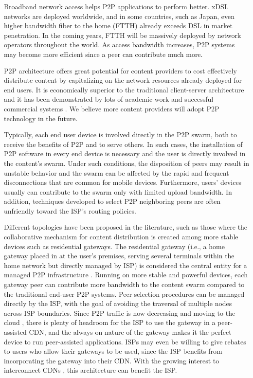 \documentclass[paper]{ieice}
\begin{document}
Broadband network access helps P2P applications to perform better.
xDSL networks are deployed worldwide, and in some countries, such as
Japan, even higher bandwidth fiber to the home (FTTH) already exceeds
DSL in market penetration.  In the coming years, FTTH will be massively
deployed by network operators throughout the world.  As access
bandwidth increases, P2P systems may become more efficient since a
peer can contribute much more.

P2P architecture offers great potential for content providers to cost
effectively distribute content by capitalizing on the network
resources already deployed for end users.  It is economically superior
to the traditional client-server architecture and it has been
demonstrated by lots of academic work and successful commercial
systems \cite{Yin:2009:DDH:1631272.1631279}.  We believe more content
providers will adopt P2P technology in the future.

Typically, each end user device is involved directly in the P2P swarm,
both to receive the benefits of P2P and to serve others.  In such
cases, the installation of P2P software in every end device is
necessary and the user is directly involved in the content's swarm.
Under such conditions, the disposition of peers may result in unstable
behavior and the swarm can be affected by the rapid and frequent
disconnections that are common for mobile devices.  Furthermore,
users' devices usually can contribute to the swarm only with limited
upload bandwidth.  In addition, techniques developed to select P2P
neighboring peers are often unfriendly toward the ISP's routing
policies.

Different topologies have been proposed in the literature, such as
those where the collaborative mechanism for content distribution is
created among more stable devices such as residential gateways.  The
residential gateway (i.e., a home gateway placed in at the user's
premises, serving several terminals within the home network but
directly managed by ISP) is considered the central entity for a
managed P2P infrastructure
\cite{Misra:2010:IPS:1811099.1811064,Cha:2008:NTP:1855641.1855646}.
Running on more stable and powerful devices, each gateway peer can
contribute more bandwidth to the content swarm compared to the
traditional end-user P2P systems.  Peer selection procedures can be
managed directly by the ISP, with the goal of avoiding the traversal
of multiple nodes across ISP boundaries.  Since P2P traffic is now
decreasing and moving to the cloud
\cite{Labovitz:2010:IIT:2043164.1851194}, there is plenty of headroom
for the ISP to use the gateway in a peer-assisted CDN, and the
always-on nature of the gateway makes it the perfect device to run
peer-assisted applications.  ISPs may even be willing to give rebates
to users who allow their gateways to be used, since the ISP benefits from incorporating the gateway into their CDN.  With the growing
interest to interconnect CDNs \cite{cdni,oceanproject}, this
architecture can benefit the ISP.
\end{document}
